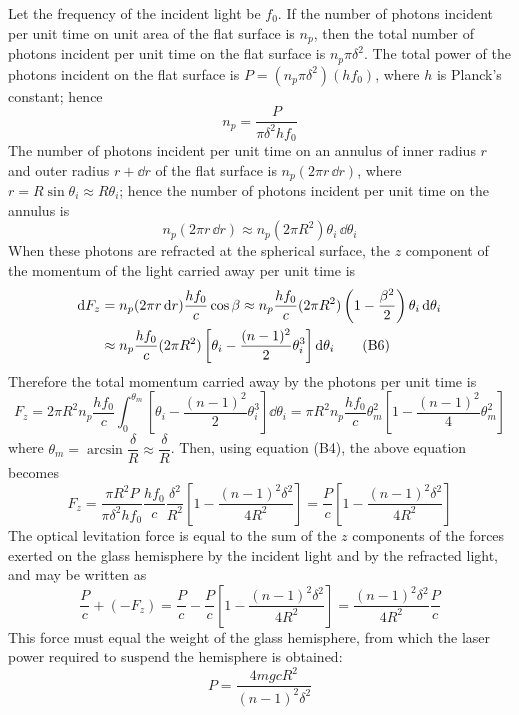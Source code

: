 Let the frequency of the incident light be $f_0$. If the number of photons incident per unit time on unit area of the flat surface is $n_p$, then the total number of photons incident per unit time on the flat surface is $n_p\pi\delta^2$. The total power of the photons incident on the flat surface is $P=(n_p\pi\delta^2)(hf_0)$, where $h$ is Planck's constant; hence
\begin{equation}
n_p=\frac{P}{\pi\delta^2hf_0} \tag{B4}
\end{equation}
The number of photons incident per unit time on an annulus of inner radius $r$ and outer radius $r+\dd r$ of the flat surface is $n_p(2\pi r\,\dd r)$, where $r=R\sin\theta_i\approx R\theta_i$; hence the number of photons incident per unit time on the annulus is
\begin{equation}
n_p(2\pi r\,\dd r)\approx n_p(2\pi R^2)\theta_i\,\dd\theta_i \tag{B5}
\end{equation}
When these photons are refracted at the spherical surface, the $z$ component of the momentum of the light carried away per unit time is
\begin{align}
\mathrm{d} F_z &= n_p(2\pi r\,\mathrm{d} r)\frac{hf_0}{c}\cos\beta\approx n_p\frac{hf_0}{c}(2\pi R^2)\left(1-\frac{\beta^2}{2}\right)\theta_i\,\mathrm{d}\theta_i\notag\\
&\approx n_p\frac{hf_0}{c}(2\pi R^2)\left[\theta_i-\frac{(n-1)^2}{2}\theta_i^3\right]\mathrm{d}\theta_i \tag{B6}
\end{align}
Therefore the total momentum carried away by the photons per unit time is
\begin{equation}
F_z=2\pi R^2n_p\frac{hf_0}{c}\int_0^{\theta_m}\left[\theta_i-\frac{(n-1)^2}{2}\theta_i^3\right]\dd\theta_i
=\pi R^2n_p\frac{hf_0}{c}\theta_m^2\left[1-\frac{(n-1)^2}{4}\theta_m^2\right] \tag{B7}
\end{equation}
where $\theta_m=\arcsin\dfrac{\delta}{R}\approx\dfrac{\delta}{R}$. Then, using equation (B4), the above equation becomes
\begin{equation}
F_z=\frac{\pi R^2P}{\pi\delta^2hf_0}\frac{hf_0}{c}\frac{\delta^2}{R^2}\left[1-\frac{(n-1)^2\delta^2}{4R^2}\right]
=\frac{P}{c}\left[1-\frac{(n-1)^2\delta^2}{4R^2}\right] \tag{B8}
\end{equation}
The optical levitation force is equal to the sum of the $z$ components of the forces exerted on the glass hemisphere by the incident light and by the refracted light, and may be written as
\begin{equation}
\frac{P}{c}+(-F_z)=\frac{P}{c}-\frac{P}{c}\left[1-\frac{(n-1)^2\delta^2}{4R^2}\right]
=\frac{(n-1)^2\delta^2}{4R^2}\frac{P}{c} \tag{B9}
\end{equation}
This force must equal the weight of the glass hemisphere, from which the laser power required to suspend the hemisphere is obtained:
\begin{equation}
P=\frac{4mgcR^2}{(n-1)^2\delta^2} \tag{B10}
\end{equation}

